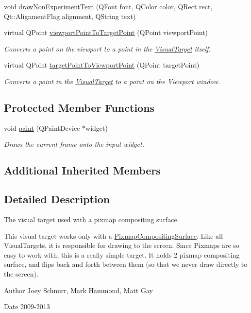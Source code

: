 \begin{DoxyCompactItemize}
void \hyperlink{struct_picto_1_1_pixmap_visual_target_afa97c03ab5b75d3d3789313f08329062}{draw\-Non\-Experiment\-Text} (Q\-Font font, Q\-Color color, Q\-Rect rect, Qt\-::\-Alignment\-Flag alignment, Q\-String text)
\item 
virtual Q\-Point \hyperlink{struct_picto_1_1_pixmap_visual_target_a8f3cb13a38045e2730ac4da01990dd8a}{viewport\-Point\-To\-Target\-Point} (Q\-Point viewport\-Point)
\begin{DoxyCompactList}\small\item\em Converts a point on the viewport to a point in the \hyperlink{class_picto_1_1_visual_target}{Visual\-Target} itself. \end{DoxyCompactList}\item 
virtual Q\-Point \hyperlink{struct_picto_1_1_pixmap_visual_target_a7c69972fed4a422d1d84dc57c5aa1fef}{target\-Point\-To\-Viewport\-Point} (Q\-Point target\-Point)
\begin{DoxyCompactList}\small\item\em Converts a point in the \hyperlink{class_picto_1_1_visual_target}{Visual\-Target} to a point on the Viewport window. \end{DoxyCompactList}\end{DoxyCompactItemize}
\subsection*{Protected Member Functions}
\begin{DoxyCompactItemize}
\item 
void \hyperlink{struct_picto_1_1_pixmap_visual_target_a4b76078115a103d4f1fda8ae8a9812c3}{paint} (Q\-Paint\-Device $\ast$widget)
\begin{DoxyCompactList}\small\item\em Draws the current frame onto the input widget. \end{DoxyCompactList}\end{DoxyCompactItemize}
\subsection*{Additional Inherited Members}


\subsection{Detailed Description}
The visual target used with a pixmap compositing surface. 

This visual target works only with a \hyperlink{class_picto_1_1_pixmap_compositing_surface}{Pixmap\-Compositing\-Surface}. Like all Visual\-Targets, it is responsible for drawing to the screen. Since Pixmaps are so easy to work with, this is a really simple target. It holds 2 pixmap compositing surface, and flips back and forth between them (so that we never draw directly to the screen). \begin{DoxyAuthor}{Author}
Joey Schnurr, Mark Hammond, Matt Gay 
\end{DoxyAuthor}
\begin{DoxyDate}{Date}
2009-\/2013 
\end{DoxyDate}


